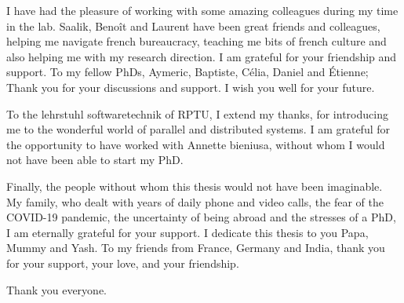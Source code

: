 I have had the pleasure of working with some amazing colleagues during my time in the lab. Saalik, Benoît and Laurent have been great friends and colleagues, helping me navigate french bureaucracy, teaching me bits of french culture and also helping me with my research direction. I am grateful for your friendship and support. To my fellow PhDs, Aymeric, Baptiste, Célia, Daniel and Étienne; Thank you for your discussions and support. I wish you well for your future. 

To the lehrstuhl softwaretechnik of RPTU, I extend my thanks, for introducing me to the wonderful world of parallel and distributed systems. I am grateful for the opportunity to have worked with Annette bieniusa, without whom I would not have been able to start my PhD.

Finally, the people without whom this thesis would not have been imaginable. My family, who dealt with years of daily phone and video calls, the fear of the COVID-19 pandemic, the uncertainty of being abroad and the stresses of a PhD, I am eternally grateful for your support. I dedicate this thesis to you Papa, Mummy and Yash. To my friends from France, Germany and India, thank you for your support, your love, and your friendship.

Thank you everyone. 